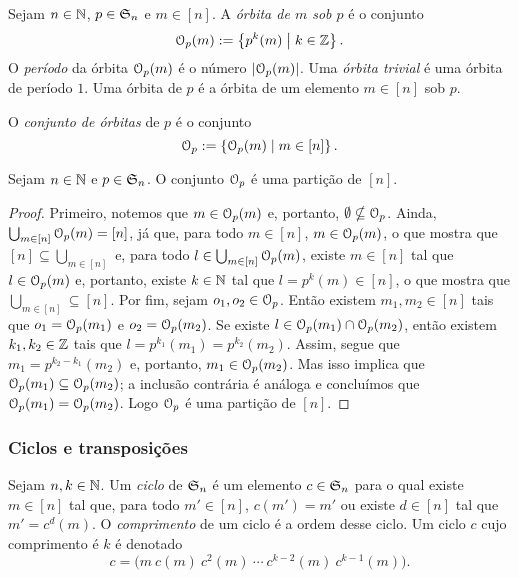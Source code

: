 \begin{definition}
	Sejam $n \in \mathbb{N}$, $p \in \mathfrak{S}_n$ e $m \in [n]$. A \emph{órbita de $m$ sob $p$} é o conjunto
	\begin{equation*}
	\mathcal{O}_p(m) := \left\{{p^k(m)}\;\middle\vert\;{k \in \mathbb{Z}}\right\}.
	\end{equation*}
O \emph{período} da órbita $\mathcal{O}_p(m)$ é o número $\left\lvert{\mathcal{O}_p(m)}\right\rvert$. Uma \emph{órbita trivial} é uma órbita de período $1$. Uma órbita de $p$ é a órbita de um elemento $m \in [n]$ sob $p$.

	O \emph{conjunto de órbitas} de $p$ é o conjunto
	\begin{equation*}
	\mathcal{O}_p := \left\{{\mathcal{O}_p(m)}\;\middle\vert\;{m \in [n]}\right\}.
	\end{equation*}
\end{definition}

\begin{proposition}
	Sejam $n \in \mathbb{N}$ e $p \in \mathfrak{S}_n$. O conjunto $\mathcal{O}_p$ é uma partição de $[n]$.
\end{proposition}
\begin{proof}
	Primeiro, notemos que $m \in \mathcal{O}_p(m)$ e, portanto, $\emptyset \nsubseteq \mathcal{O}_p$. Ainda, $\bigcup_{m \in [n]} \mathcal{O}_p(m) = [n]$, já que, para todo $m \in [n]$, $m \in \mathcal{O}_p(m)$, o que mostra que $[n] \subseteq \bigcup_{m \in [n]}$ e, para todo $l \in \bigcup_{m \in [n]} \mathcal{O}_p(m)$, existe $m \in [n]$ tal que $l \in \mathcal{O}_p(m)$ e, portanto, existe $k \in \mathbb{N}$ tal que $l=p^k(m) \in [n]$, o que mostra que $\bigcup_{m \in [n]} \subseteq [n]$. Por fim, sejam $o_1,o_2 \in \mathcal{O}_p$. Então existem $m_1,m_2 \in [n]$ tais que $o_1=\mathcal{O}_p(m_1)$ e $o_2=\mathcal{O}_p(m_2)$. Se existe $l \in \mathcal{O}_p(m_1) \cap \mathcal{O}_p(m_2)$, então existem $k_1,k_2 \in \mathbb{Z}$ tais que $l=p^{k_1}(m_1)=p^{k_2}(m_2)$. Assim, segue que $m_1=p^{k_2-k_1}(m_2)$ e, portanto, $m_1 \in \mathcal{O}_p(m_2)$. Mas isso implica que $\mathcal{O}_p(m_1) \subseteq \mathcal{O}_p(m_2)$; a inclusão contrária é análoga e concluímos que $\mathcal{O}_p(m_1) = \mathcal{O}_p(m_2)$. Logo $\mathcal{O}_p$ é uma partição de $[n]$.
\end{proof}

\subsubsection{Ciclos e transposições}

\begin{definition}
	Sejam $n,k \in \mathbb{N}$. Um \emph{ciclo} de $\mathfrak{S}_n$ é um elemento $c \in \mathfrak{S}_n$ para o qual existe $m \in [n]$ tal que, para todo $m' \in [n]$, $c(m')=m'$ ou existe $d \in [n]$ tal que $m'=c^d(m)$. O \emph{comprimento} de um ciclo é a ordem desse ciclo. Um ciclo $c$ cujo comprimento é $k$ é denotado
	\begin{equation*}
	c = \bigl(m \ c(m) \ c^2(m) \ \cdots \  c^{k-2}(m) \ c^{k-1}(m)\bigr).
	\end{equation*}
\end{definition}


